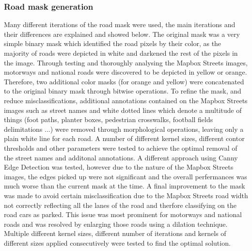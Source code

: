 \subsubsection{Road mask generation}
Many different iterations of the road mask were used, the main iterations and their differences are explained and showed below.
The original mask was a very simple binary mask which identified the road pixels by their color, as the majority of roads were depicted in white and darkened the rest of the pixels in the image.
Through testing and thoroughly analysing the Mapbox Streets images, motorways and national roads were discovered to be depicted in yellow or orange. Therefore, two additional color masks (for orange and yellow) were concatenated to the original binary mask through bitwise operations.
To refine the mask, and reduce misclassifications, additional annotations contained on the Mapbox Streets images such as street names and white dotted lines which denote a multitude of things (foot paths, planter boxes, pedestrian crosswalks, football fields delimitations ...) were removed through morphological operations, leaving only a plain white line for each road.
A number of different kernel sizes, different contor thresholds and other parameters were tested to achieve the optimal removal of the street names and additonal annotations.
A different approach using Canny Edge Detection was tested, however due to the nature of the Mapbox Streets images, the edges picked up were not significant and the overall perfermances was much worse than the current mask at the time.
A final improvement to the mask was made to avoid certain misclassification due to the Mapbox Streets road width not correctly reflecting all the lanes of the road and therfore classifying on the road cars as parked. This issue was most prominent for motorways and national roads and was resolved by enlarging those roads using a dilation technique. Multiple different kernel sizes, different number of iterations and kernels of different sizes applied consecutively were tested to find the optimal solution.


